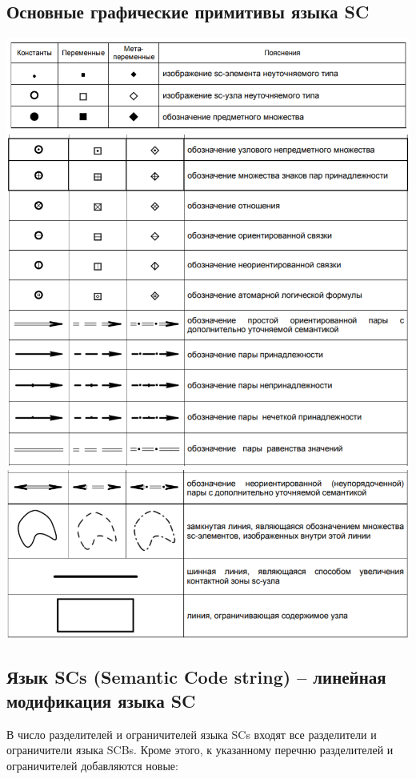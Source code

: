 \subsection{Основные графические примитивы языка SC}
 \includegraphics[scale=0.5]{images/sc1.png}
 \includegraphics[scale=0.5]{images/sc2.png}
 \includegraphics[scale=0.5]{images/sc3.png}
 
 \subsection{Язык SCs (Semantic Code string) – линейная модификация языка
SC}

 В число разделителей и ограничителей языка SCs входят все разделители и ограничители языка SCBs. Кроме этого, к указанному перечню разделителей и ограничителей добавляются новые:
 
